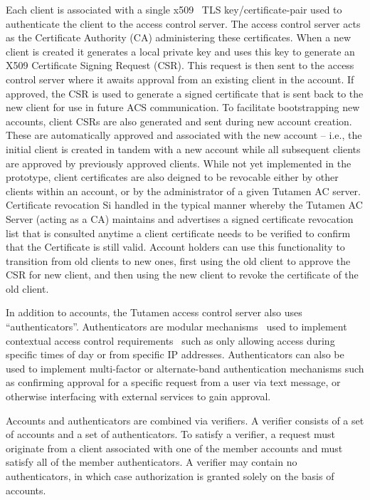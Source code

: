 Each client is associated with a single x509~\cite{rfc5280} TLS
key/certificate-pair used to authenticate the client to the access
control server. The access control server acts as the Certificate
Authority (CA) administering these certificates. When a new client is
created it generates a local private key and uses this key to generate
an X509 Certificate Signing Request (CSR). This request is then sent
to the access control server where it awaits approval from an existing
client in the account. If approved, the CSR is used to generate a
signed certificate that is sent back to the new client for use in
future ACS communication. To facilitate bootstrapping new accounts,
client CSRs are also generated and sent during new account
creation. These are automatically approved and associated with the new
account -- i.e., the initial client is created in tandem with a new
account while all subsequent clients are approved by previously
approved clients. While not yet implemented in the prototype, client
certificates are also deigned to be revocable either by other clients
within an account, or by the administrator of a given Tutamen AC
server. Certificate revocation Si handled in the typical manner
whereby the Tutamen AC Server (acting as a CA) maintains and
advertises a signed certificate revocation list that is consulted
anytime a client certificate needs to be verified to confirm that the
Certificate is still valid. Account holders can use this functionality
to transition from old clients to new ones, first using the old client
to approve the CSR for new client, and then using the new client to
revoke the certificate of the old client.

In addition to accounts, the Tutamen access control server also uses
``authenticators''. Authenticators are modular
mechanisms~\cite{samar1996} used to implement contextual access
control requirements~\cite{hulsebosch2005} such as only allowing
access during specific times of day or from specific IP
addresses. Authenticators can also be used to implement multi-factor
or alternate-band authentication mechanisms such as confirming
approval for a specific request from a user via text message, or
otherwise interfacing with external services to gain approval.

Accounts and authenticators are combined via verifiers. A verifier
consists of a set of accounts and a set of authenticators. To satisfy
a verifier, a request must originate from a client associated with one
of the member accounts and must satisfy all of the member
authenticators. A verifier may contain no authenticators, in which
case authorization is granted solely on the basis of accounts.

